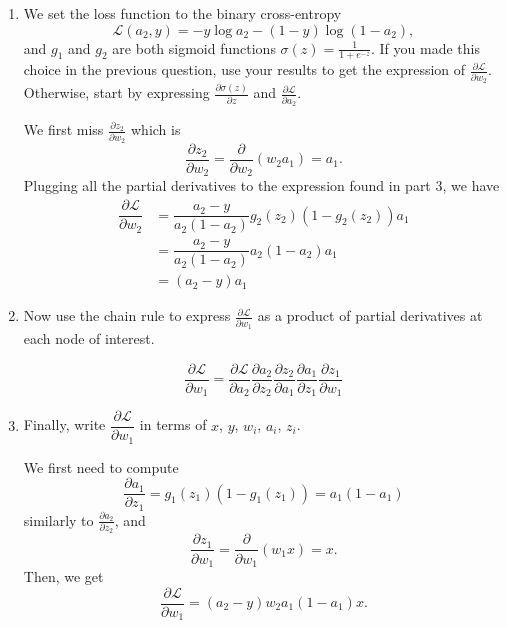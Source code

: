 \documentclass[11pt, a4paper]{article}
\begin{document}
\begin{enumerate}
    \item We set the loss function to the binary cross-entropy $$\mathcal{L}(a_2, y) = -y\log a_2 - (1-y) \log (1 - a_2),$$ and $g_1$ and $g_2$ are both sigmoid functions $\sigma(z) = \frac{1}{1 + e^{-z}}$. If you made this choice in the previous question, use your results to get the expression of $\frac{\partial \mathcal{L}}{\partial w_2}$. Otherwise, start by expressing $\frac{\partial \sigma(z)}{\partial z}$ and $\frac{\partial \mathcal{L}}{\partial a_2}$.

    \begin{solution}
        We first miss $\frac{\partial z_2}{\partial w_2}$ which is
        $$
            \frac{\partial z_2}{\partial w_2} =  \frac{\partial}{\partial w_2} (w_2a_1) = a_1.
        $$
        Plugging all the partial derivatives to the expression found in part 3, we have
        \begin{align*}
            \dfrac{\partial \mathcal{L}}{\partial w_2} &= \dfrac{a_2 - y}{a_2 (1 - a_2)} g_2(z_2)(1 - g_2(z_2)) a_1 \\
            &= \dfrac{a_2 - y}{a_2 (1 - a_2)} a_2(1 - a_2) a_1\\
            &= (a_2 - y) a_1
        \end{align*}
    
    \end{solution}

    \item Now use the chain rule to express $\frac{\partial \mathcal{L}}{\partial w_1}$ as a product of partial derivatives at each node of interest.

    \begin{solution}
        $$
        \frac{\partial \mathcal{L}}{\partial w_1} = \dfrac{\partial \mathcal{L}}{\partial a_2} \dfrac{\partial a_2}{\partial z_2} \dfrac{\partial z_2}{\partial a_1} \dfrac{\partial a_1}{\partial z_1} \dfrac{\partial z_1}{\partial w_1}
        $$
    \end{solution}

    \item Finally, write $\dfrac{\partial \mathcal{L}}{\partial w_1}$ in terms of $x$, $y$, $w_i$, $a_i$, $z_i$.

    \begin{solution}
        We first need to compute 
        $$
            \frac{\partial a_1}{\partial z_1} =  g_1(z_1)(1 - g_1(z_1)) = a_1(1-a_1)
        $$
        similarly to $\frac{\partial a_2}{\partial z_2}$, and
        $$
            \frac{\partial z_1}{\partial w_1} =  \frac{\partial}{\partial w_1} (w_1x) = x.
        $$
        Then, we get 
        $$
            \frac{\partial \mathcal{L}}{\partial w_1} = (a_2 - y)w_2 a_1(1-a_1)x.
        $$
    \end{solution}


\end{enumerate}
\end{document}

